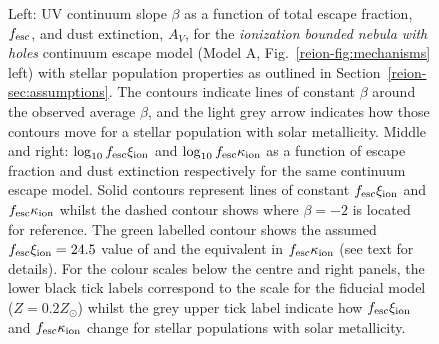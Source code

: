 \begin{landscape}
\begin{figure}
  \caption[UV continuum slope $\beta$, $\log_{10}f_{\rm{esc}}\xi_{\rm{ion}}$ and $\log_{10}f_{\rm{esc}}\kappa_{\rm{ion}}$ as a function of total escape fraction, $f_{\rm{esc}}$, and dust extinction, $A_{V}$, for the \emph{ionization bounded nebula with holes} continuum escape model (Model A, Fig.~\ref{reion-fig:mechanisms} left) with stellar population properties as outlined in Section~\ref{reion-sec:assumptions}.]{Left: UV continuum slope $\beta$ as a function of total escape fraction, $f_{\rm{esc}}$, and dust extinction, $A_{V}$, for the \emph{ionization bounded nebula with holes} continuum escape model (Model A, Fig.~\ref{reion-fig:mechanisms} left) with stellar population properties as outlined in Section~\ref{reion-sec:assumptions}. The contours indicate lines of constant $\beta$ around the observed average $\beta$, and the light grey arrow indicates how those contours move for a stellar population with solar metallicity. Middle and right: $\log_{10}f_{\rm{esc}}\xi_{\rm{ion}}$ and $\log_{10}f_{\rm{esc}}\kappa_{\rm{ion}}$ as a function of escape fraction and dust extinction respectively for the same continuum escape model. Solid contours represent lines of constant $f_{\rm{esc}}\xi_{\rm{ion}}$ and $f_{\rm{esc}}\kappa_{\rm{ion}}$ whilst the dashed contour shows where $\beta = -2$ is located for reference. The green labelled contour shows the assumed $f_{\rm{esc}}\xi_{\rm{ion}} = 24.5$ value of  and the equivalent in $f_{\rm{esc}}\kappa_{\rm{ion}}$ (see text for details). For the colour scales below the centre and right panels, the lower black tick labels correspond to the scale for the fiducial model ($Z = 0.2 Z_{\odot}$) whilst the grey upper tick label indicate how $f_{\rm{esc}}\xi_{\rm{ion}}$ and $f_{\rm{esc}}\kappa_{\rm{ion}}$ change for stellar populations with solar metallicity.}
  \label{reion-fig:fesc_cover}
\end{figure}
\end{landscape}

